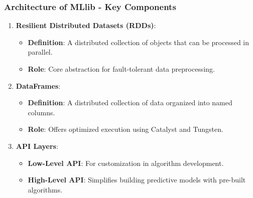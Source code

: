 \documentclass[aspectratio=169]{beamer}
\begin{document}
\begin{frame}[fragile]
    \frametitle{Architecture of MLlib - Key Components}
    \begin{enumerate}
        \item \textbf{Resilient Distributed Datasets (RDDs)}:
            \begin{itemize}
                \item \textbf{Definition}: A distributed collection of objects that can be processed in parallel.
                \item \textbf{Role}: Core abstraction for fault-tolerant data preprocessing.
            \end{itemize}
        
        \item \textbf{DataFrames}:
            \begin{itemize}
                \item \textbf{Definition}: A distributed collection of data organized into named columns.
                \item \textbf{Role}: Offers optimized execution using Catalyst and Tungsten.
            \end{itemize}
        
        \item \textbf{API Layers}:
            \begin{itemize}
                \item \textbf{Low-Level API}: For customization in algorithm development.
                \item \textbf{High-Level API}: Simplifies building predictive models with pre-built algorithms.
            \end{itemize}
    \end{enumerate}
\end{frame}
\end{document}
